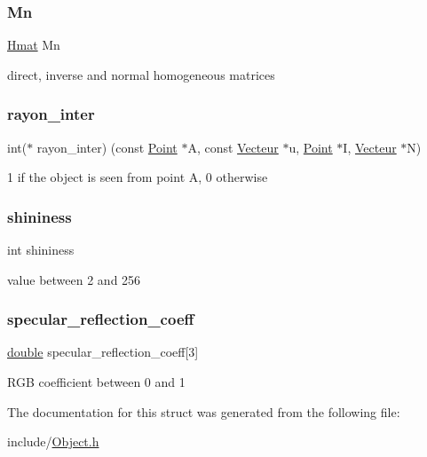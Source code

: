 \mbox{\label{struct_object_a377e7ee9e852999ea0e10c66d74ddfb4}} 
\subsubsection{\texorpdfstring{Mn}{Mn}}
{\footnotesize\ttfamily \hyperlink{_hmat_8h_a7263a9d077d77f58425e01446b766c9f}{Hmat} Mn}

direct, inverse and normal homogeneous matrices \mbox{\label{struct_object_a3f68899f8db0dc480e823d27163e1639}} 
\subsubsection{\texorpdfstring{rayon\+\_\+inter}{rayon\_inter}}
{\footnotesize\ttfamily int($\ast$ rayon\+\_\+inter) (const \hyperlink{struct_point}{Point} $\ast$A, const \hyperlink{struct_vecteur}{Vecteur} $\ast$u, \hyperlink{struct_point}{Point} $\ast$I, \hyperlink{struct_vecteur}{Vecteur} $\ast$N)}

1 if the object is seen from point A, 0 otherwise \mbox{\label{struct_object_ac8b96df3945daad611d0e916baf3fd33}} 
\subsubsection{\texorpdfstring{shininess}{shininess}}
{\footnotesize\ttfamily int shininess}

value between 2 and 256 \mbox{\label{struct_object_a7b9fa288e1cec876534bd6f5b17aa049}} 
\subsubsection{\texorpdfstring{specular\+\_\+reflection\+\_\+coeff}{specular\_reflection\_coeff}}
{\footnotesize\ttfamily \hyperlink{g3x__transfo_8h_a89b2b23e407882a535d835574a7912e1}{double} specular\+\_\+reflection\+\_\+coeff\mbox{[}3\mbox{]}}

R\+GB coefficient between 0 and 1 

The documentation for this struct was generated from the following file\+:\begin{DoxyCompactItemize}
\item 
include/\hyperlink{_object_8h}{Object.\+h}\end{DoxyCompactItemize}
